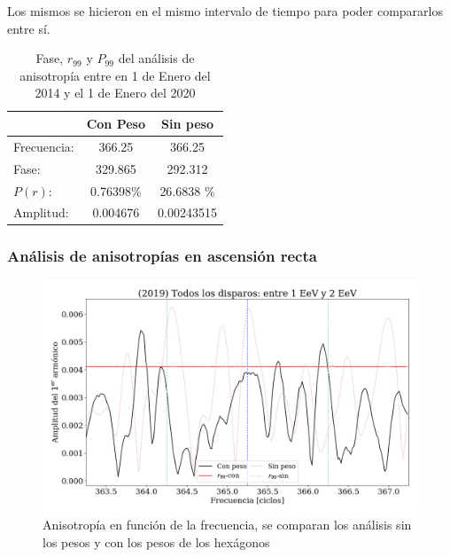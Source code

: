  Los mismos se hicieron en el mismo intervalo de tiempo para poder compararlos entre sí. 
 



\begin{table}[H]
\centering
\begin{tabular}{l|c|c}
				& Con Peso 	& Sin peso 		\\ \hline
Frecuencia:		& 366.25 	& 366.25 		\\
Fase:			& 329.865 	& 292.312		\\
$P(r)$:			& 0.76398\%	& 26.6838 \% 	\\
Amplitud:		& 0.004676 	& 0.00243515	\\
\end{tabular}
\caption{Fase, $r_{99}$ y $P_{99}$ del análisis de anisotropía entre en 1 de Enero del 2014 y el 1 de Enero del 2020}
\end{table}





	\subsubsection{Análisis de anisotropías en ascensión recta}
		
		\begin{figure}[H]
			\centering
			\includegraphics[width=0.75\linewidth]{pesos_sin_con_1_2_EeV.png}
			\caption{Anisotropía en función de la frecuencia, se comparan los análisis sin los pesos y con los pesos de los hexágonos}
		\end{figure}
		
